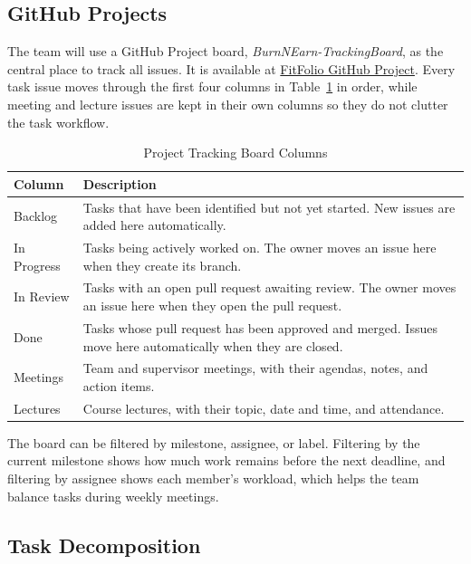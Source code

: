 \documentclass{article}
\begin{document}
\subsection{GitHub Projects} \label{SecGitHubProjects}

The team will use a GitHub Project board, \textit{BurnNEarn-TrackingBoard}, as the central place to track all issues. It is available at \href{https://github.com/users/davislenover/projects/4/views/1}{FitFolio GitHub Project}. 
Every task issue moves through the first four columns in Table~\ref{TblBoardColumns} in order, while meeting and lecture issues are kept in their own columns so they do not clutter the task workflow.

\begin{table}[H]
  \caption{Project Tracking Board Columns} \label{TblBoardColumns}
  \begin{tabularx}{\textwidth}{l>{\raggedright\arraybackslash}X}
    \toprule
    \textbf{Column} & \textbf{Description}\\
    \midrule
      Backlog & Tasks that have been identified but not yet started. New issues are added here automatically.\\
      In Progress & Tasks being actively worked on. The owner moves an issue here when they create its branch.\\
      In Review & Tasks with an open pull request awaiting review. The owner moves an issue here when they open the pull request.\\
      Done & Tasks whose pull request has been approved and merged. Issues move here automatically when they are closed.\\
      Meetings & Team and supervisor meetings, with their agendas, notes, and action items.\\
      Lectures & Course lectures, with their topic, date and time, and attendance.\\
    \bottomrule
  \end{tabularx}
\end{table}

The board can be filtered by milestone, assignee, or label. Filtering by the current milestone shows how much work remains before the next deadline, and filtering by assignee shows each member's workload, which helps the team balance tasks during weekly meetings.

\subsection{Task Decomposition}
\end{document}
